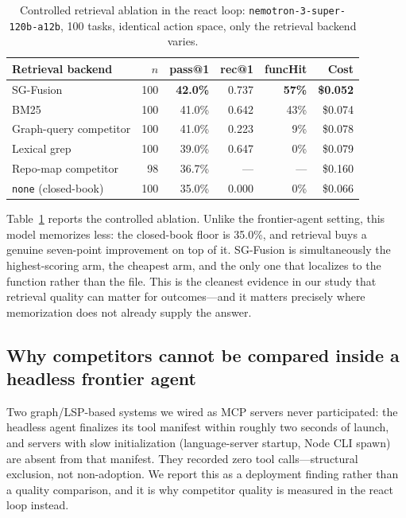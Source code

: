 \documentclass[11pt,letterpaper]{article}
\begin{document}
\begin{table}[t]
\centering
\begin{tabular}{lrrrrr}
\toprule
Retrieval backend & $n$ & pass@1 & rec@1 & funcHit & Cost \\
\midrule
SG-Fusion            & 100 & \textbf{42.0\%} & 0.737 & \textbf{57\%} & \textbf{\$0.052} \\
BM25                    & 100 & 41.0\% & 0.642 & 43\% & \$0.074 \\
Graph-query competitor  & 100 & 41.0\% & 0.223 & 9\%  & \$0.078 \\
Lexical grep            & 100 & 39.0\% & 0.647 & 0\%  & \$0.079 \\
Repo-map competitor     &  98 & 36.7\% & ---   & ---  & \$0.160 \\
\texttt{none} (closed-book) & 100 & 35.0\% & 0.000 & 0\% & \$0.066 \\
\bottomrule
\end{tabular}
\caption{Controlled retrieval ablation in the react loop:
\texttt{nemotron-3-super-120b-a12b}, 100 tasks, identical action space, only the
retrieval backend varies.}
\label{tab:react}
\end{table}

Table~\ref{tab:react} reports the controlled ablation. Unlike the frontier-agent
setting, this model memorizes less: the closed-book floor is 35.0\%, and
retrieval buys a genuine seven-point improvement on top of it. SG-Fusion is
simultaneously the highest-scoring arm, the cheapest arm, and the only one that
localizes to the function rather than the file. This is the cleanest evidence in
our study that retrieval quality can matter for outcomes---and it matters
precisely where memorization does not already supply the answer.

\subsection{Why competitors cannot be compared inside a headless frontier agent}
\label{sec:exclusion}
Two graph/LSP-based systems we wired as MCP servers never participated: the
headless agent finalizes its tool manifest within roughly two seconds of launch,
and servers with slow initialization (language-server startup, Node CLI spawn)
are absent from that manifest. They recorded zero tool calls---structural
exclusion, not non-adoption. We report this as a deployment finding rather than
a quality comparison, and it is why competitor quality is measured in the react
loop instead.
\end{document}
